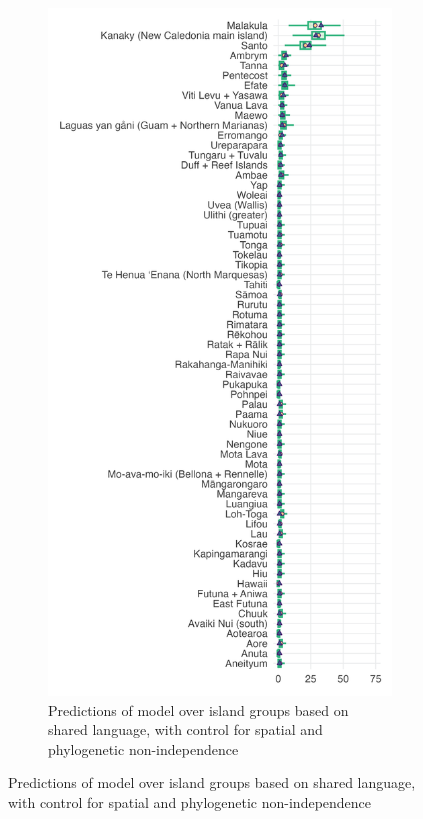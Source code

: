\documentclass[unnumsec,webpdf,modern,medium]{oup-authoring-template}
\begin{document}
\begin{figure}
\centering
\begin{subfigure}{0.48\textwidth}
  \centering
\includegraphics[width=1\textwidth]{brms_predict_medium_control_spatialphylo.png}
\caption{Predictions of model over island groups based on shared language, with control for spatial and phylogenetic non-independence}

\end{subfigure}
\end{figure}
\end{document}
